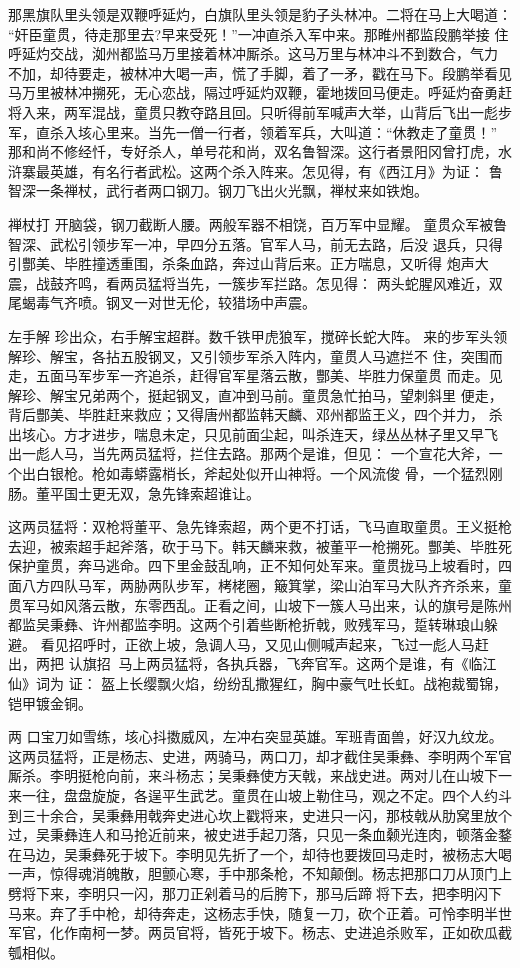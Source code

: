 那黑旗队里头领是双鞭呼延灼，白旗队里头领是豹子头林冲。二将在马上大喝道：
“奸臣童贯，待走那里去?早来受死！”一冲直杀入军中来。那睢州都监段鹏举接
住呼延灼交战，洳州都监马万里接着林冲厮杀。这马万里与林冲斗不到数合，气力
不加，却待要走，被林冲大喝一声，慌了手脚，着了一矛，戳在马下。段鹏举看见
马万里被林冲搠死，无心恋战，隔过呼延灼双鞭，霍地拨回马便走。呼延灼奋勇赶
将入来，两军混战，童贯只教夺路且回。只听得前军喊声大举，山背后飞出一彪步
军，直杀入垓心里来。当先一僧一行者，领着军兵，大叫道：“休教走了童贯！”
那和尚不修经忏，专好杀人，单号花和尚，双名鲁智深。这行者景阳冈曾打虎，水
浒寨最英雄，有名行者武松。这两个杀入阵来。怎见得，有《西江月》为证：
鲁智深一条禅杖，武行者两口钢刀。钢刀飞出火光飘，禅杖来如铁炮。

禅杖打
开脑袋，钢刀截断人腰。两般军器不相饶，百万军中显耀。
童贯众军被鲁智深、武松引领步军一冲，早四分五落。官军人马，前无去路，后没
退兵，只得引酆美、毕胜撞透重围，杀条血路，奔过山背后来。正方喘息，又听得
炮声大震，战鼓齐鸣，看两员猛将当先，一簇步军拦路。怎见得：
两头蛇腥风难近，双尾蝎毒气齐喷。钢叉一对世无伦，较猎场中声震。

左手解
珍出众，右手解宝超群。数千铁甲虎狼军，搅碎长蛇大阵。
来的步军头领解珍、解宝，各拈五股钢叉，又引领步军杀入阵内，童贯人马遮拦不
住，突围而走，五面马军步军一齐追杀，赶得官军星落云散，酆美、毕胜力保童贯
而走。见解珍、解宝兄弟两个，挺起钢叉，直冲到马前。童贯急忙拍马，望刺斜里
便走，背后酆美、毕胜赶来救应；又得唐州都监韩天麟、邓州都监王义，四个并力，
杀出垓心。方才进步，喘息未定，只见前面尘起，叫杀连天，绿丛丛林子里又早飞
出一彪人马，当先两员猛将，拦住去路。那两个是谁，但见：
一个宣花大斧，一个出白银枪。枪如毒蟒露梢长，斧起处似开山神将。一个风流俊
骨，一个猛烈刚肠。董平国士更无双，急先锋索超谁让。

这两员猛将：双枪将董平、急先锋索超，两个更不打话，飞马直取童贯。王义挺枪
去迎，被索超手起斧落，砍于马下。韩天麟来救，被董平一枪搠死。酆美、毕胜死
保护童贯，奔马逃命。四下里金鼓乱响，正不知何处军来。童贯拢马上坡看时，四
面八方四队马军，两胁两队步军，栲栳圈，簸箕掌，梁山泊军马大队齐齐杀来，童
贯军马如风落云散，东零西乱。正看之间，山坡下一簇人马出来，认的旗号是陈州
都监吴秉彝、许州都监李明。这两个引着些断枪折戟，败残军马，踅转琳琅山躲避。
看见招呼时，正欲上坡，急调人马，又见山侧喊声起来，飞过一彪人马赶出，两把
认旗招，马上两员猛将，各执兵器，飞奔官军。这两个是谁，有《临江仙》词为
证：
盔上长缨飘火焰，纷纷乱撒猩红，胸中豪气吐长虹。战袍裁蜀锦，铠甲镀金铜。

两
口宝刀如雪练，垓心抖擞威风，左冲右突显英雄。军班青面兽，好汉九纹龙。
这两员猛将，正是杨志、史进，两骑马，两口刀，却才截住吴秉彝、李明两个军官
厮杀。李明挺枪向前，来斗杨志；吴秉彝使方天戟，来战史进。两对儿在山坡下一
来一往，盘盘旋旋，各逞平生武艺。童贯在山坡上勒住马，观之不定。四个人约斗
到三十余合，吴秉彝用戟奔史进心坎上戳将来，史进只一闪，那枝戟从肋窝里放个
过，吴秉彝连人和马抢近前来，被史进手起刀落，只见一条血颡光连肉，顿落金鍪
在马边，吴秉彝死于坡下。李明见先折了一个，却待也要拨回马走时，被杨志大喝
一声，惊得魂消魄散，胆颤心寒，手中那条枪，不知颠倒。杨志把那口刀从顶门上
劈将下来，李明只一闪，那刀正剁着马的后胯下，那马后蹄将下去，把李明闪下
马来。弃了手中枪，却待奔走，这杨志手快，随复一刀，砍个正着。可怜李明半世
军官，化作南柯一梦。两员官将，皆死于坡下。杨志、史进追杀败军，正如砍瓜截
瓠相似。

